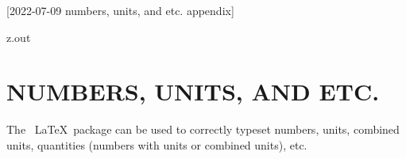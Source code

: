 [2022-07-09 numbers, units, and etc. appendix]

%

\begin{VerbatimOut}{z.out}
\chapter{NUMBERS, UNITS, AND ETC.}

The \siunitxLogo\ \LaTeX\ package
\cite{wright2022}
can be used
to correctly typeset
numbers,
units,
combined units,
quantities (numbers with units or combined units),
etc.
\end{VerbatimOut}

\MyIO


